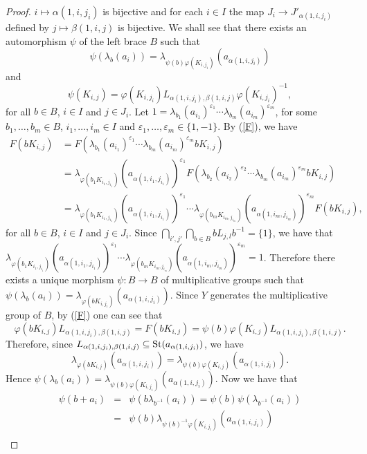 \begin{proof}
	$i\mapsto \alpha(1,i,j_i)$ is bijective and for each $i\in I$ the
	map $J_i\rightarrow J'_{\alpha(1,i,j_i)}$ defined by $j\mapsto
	\beta(1,i,j)$ is bijective. We shall see that there exists an
	automorphism $\psi$ of the left brace $B$ such that
	$$\psi(\lambda_b(a_i))=\lambda_{\psi(b)\varphi(K_{i,j_i})}(a_{\alpha(1,i,j_i)})$$
	and
	$$\psi(K_{i,j})=\varphi(K_{i,j_i})L_{\alpha(1,i,j_i),\beta(1,i,j)}\varphi(K_{i,j_i})^{-1},$$
	for all $b\in B$, $i\in I$ and $j\in J_i$. Let
	$1=\lambda_{b_1}(a_{i_1})^{\varepsilon_1}\cdots
	\lambda_{b_m}(a_{i_m})^{\varepsilon_m}$, for some $b_1,\dots ,b_m\in
	B$, $i_1,\dots ,i_m\in I$ and $\varepsilon_1,\dots ,\varepsilon_m\in
	\{ 1,-1\}$. By (\ref{F}), we have
	\begin{align*}
		F(bK_{i,j})&=F(\lambda_{b_1}(a_{i_1})^{\varepsilon_1}\cdots
		\lambda_{b_m}(a_{i_m})^{\varepsilon_m}bK_{i,j})\\
		&=\lambda_{\varphi(b_1K_{i_1,j_{i_1}})}(a_{\alpha(1,i_1,j_{i_1})})^{\varepsilon_1}F(\lambda_{b_2}(a_{i_2})^{\varepsilon_2}\cdots
		\lambda_{b_m}(a_{i_m})^{\varepsilon_m}bK_{i,j})\\
		&=\lambda_{\varphi(b_1K_{i_1,j_{i_1}})}(a_{\alpha(1,i_1,j_{i_1})})^{\varepsilon_1}\cdots
		\lambda_{\varphi(b_mK_{i_m,j_{i_m}})}(a_{\alpha(1,i_m,j_{i_m})})^{\varepsilon_m}F(bK_{i,j}),
	\end{align*}
	for all $b\in B$, $i\in I$ and $ j\in J_i$. Since
	$\bigcap_{i',j'}\bigcap_{b\in B}bL_{j,l}b^{-1}=\{ 1\}$, we have that
	$\lambda_{\varphi(b_1K_{i_1,j_{i_1}})}(a_{\alpha(1,i_1,j_{i_1})})^{\varepsilon_1}\cdots
	\lambda_{\varphi(b_mK_{i_m,j_{i_m}})}(a_{\alpha(1,i_m,j_{i_m})})^{\varepsilon_m}=1$.
	Therefore there exists a unique morphism $\psi\colon B\rightarrow B$
	of multiplicative groups such that
	$\psi(\lambda_b(a_i))=\lambda_{\varphi(bK_{i,j_{i}})}(a_{\alpha(1,i,j_i)})$.
	Since $Y$ generates the multiplicative group of $B$, by (\ref{F})
	one can see that
	$$\varphi(bK_{i,j})L_{\alpha(1,i,j_i),\beta(1,i,j)}=F(bK_{i,j})=\psi(b)\varphi(K_{i,j})L_{\alpha(1,i,j_i),\beta(1,i,j)}.$$
	Therefore, since $L_{\alpha(1,i,j_i),\beta(1,i,j)}\subseteq
	\operatorname{St}(a_{\alpha(1,i,j_i)})$, we have
	$$\lambda_{\varphi(bK_{i,j})}(a_{\alpha(1,i,j_i)})=\lambda_{\psi(b)\varphi(K_{i,j})}(a_{\alpha(1,i,j_i)}).$$
	Hence
	$\psi(\lambda_b(a_i))=\lambda_{\psi(b)\varphi(K_{i,j_i})}(a_{\alpha(1,i,j_i)})$.
	Now we have that
	\begin{eqnarray*}
		\psi(b+a_i)&=&\psi(b\lambda_{b^{-1}}(a_i))=\psi(b)\psi(\lambda_{b^{-1}}(a_i))\\
		&=&\psi(b)\lambda_{\psi(b)^{-1}\varphi(K_{i,j_i})}(a_{\alpha(1,i,j_i)})\\

\end{eqnarray*}
\end{proof}
